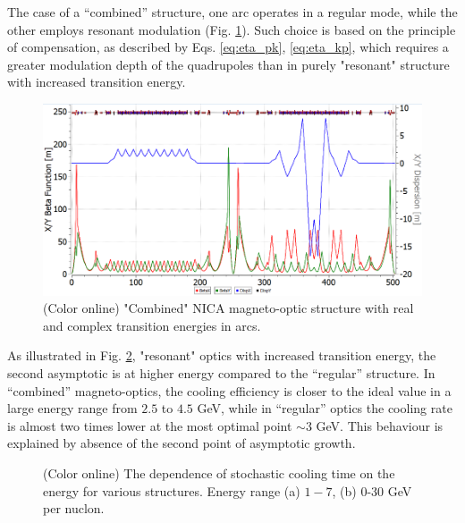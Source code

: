 \documentclass[submitting]{nst}
\begin{document}
\noindent The case of a “combined” structure, one arc operates in a regular mode, while the other employs resonant modulation (Fig. \ref{fig:combined}). Such choice is based on the principle of compensation, as described by Eqs. \ref{eq:eta_pk}, \ref{eq:eta_kp}, which requires a greater modulation depth of the quadrupoles than in purely "resonant" structure with increased transition energy.
\begin{figure}[!htb]
\includegraphics[width=\hsize]{fig4_combined.png}
\caption{(Color online) "Combined" NICA magneto-optic structure with real and complex transition energies in arcs.}
\label{fig:combined}
\end{figure}	
\noindent As illustrated in Fig. \ref{fig:sc}, "resonant" optics with increased transition energy, the second asymptotic is at higher energy compared to the “regular” structure. In “combined” magneto-optics, the cooling efficiency is closer to the ideal value in a large energy range from $2.5$ to $4.5$ GeV, while in “regular” optics the cooling rate is almost two times lower at the most optimal point $\sim3$ GeV. This behaviour is explained by absence of the second point of asymptotic growth.
\begin{figure}[!htb]
\centering
{}
\caption{(Color online) The dependence of stochastic cooling time on the energy for various structures. Energy range (a) $1-7$, (b) 0-30 GeV per nuclon.}
\label{fig:sc}
\end{figure}	
\end{document}
